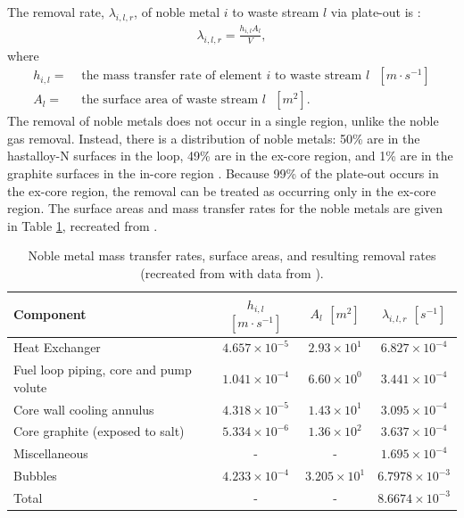 The removal rate, $\lambda_{i, l, r}$, of noble metal $i$ to waste stream $l$ via plate-out is \cite{lo2022application}:
\begin{align}
    \lambda_{i, l, r} = \frac{h_{i, l} A_l}{V},
    \label{eq:rem-plateout}
\end{align}
where
\begin{align}
    h_{i, l} =& \text{ the mass transfer rate of element $i$ to waste stream $l$ $[m \cdot s^{-1}]$} \nonumber \\
    A_l =& \text{ the surface area of waste stream $l$ $[m^2]$.} \nonumber
\end{align}
The removal of noble metals does not occur in a single region, unlike the noble gas removal.
Instead, there is a distribution of noble metals: 50\% are in the hastalloy-N surfaces in the loop, 49\% are in the ex-core region, and 1\% are in the graphite surfaces in the in-core region \cite{kedl1972migration}.
Because 99\% of the plate-out occurs in the ex-core region, the removal can be treated as occurring only in the ex-core region.
The surface areas and mass transfer rates for the noble metals are given in Table \ref{tab:noblemetals}, recreated from \cite{lo2022application}.

\begin{table}[H]
    \centering
    \caption{Noble metal mass transfer rates, surface areas, and resulting removal rates (recreated from \cite{lo2022application} with data from \cite{kedl1972migration}).}
    \begin{tabular}{lccc}
        \hline
        Component & $h_{i, l}$ $[m \cdot s^{-1}]$ & $A_l$ $[m^2]$ & $\lambda_{i, l, r}$ $[s^{-1}]$ \\
        \hline
        Heat Exchanger & $4.657 \times 10^{-5}$ & $2.93 \times 10^1$ & $6.827 \times 10^{-4}$ \\
        Fuel loop piping, core and pump volute & $1.041 \times 10^{-4}$ & $6.60 \times 10^0$ & $3.441 \times 10^{-4}$ \\
        Core wall cooling annulus & $4.318 \times 10^{-5}$ & $1.43 \times 10^1$ & $3.095 \times 10^{-4}$ \\
        Core graphite (exposed to salt) & $5.334 \times 10^{-6}$ & $1.36 \times 10^2$ & $3.637 \times 10^{-4}$ \\
        Miscellaneous & - & - & $1.695 \times 10^{-4}$ \\
        Bubbles & $4.233 \times 10^{-4}$ & $3.205 \times 10^1$ & $6.7978 \times 10^{-3}$ \\
        \hline
        Total & - & - & $8.6674 \times 10^{-3}$ \\
    \end{tabular}
    \label{tab:noblemetals}
\end{table}





